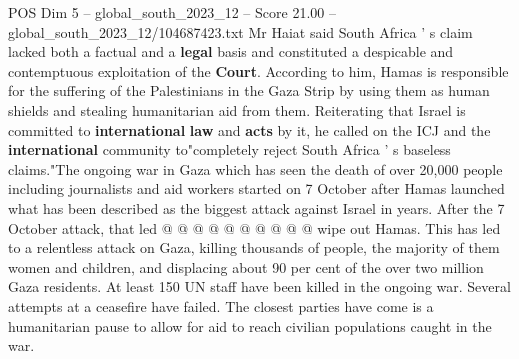\begin{textsample}{POS Dim 5 – global\_south\_2023\_12 – Score 21.00 – global\_south\_2023\_12/104687423.txt}
Mr Haiat said South Africa ' s claim lacked both a factual and a \textbf{legal} basis and constituted a despicable and contemptuous exploitation of the \textbf{Court}.
According to him, Hamas is responsible for the suffering of the Palestinians in the Gaza Strip by using them as human shields and stealing humanitarian aid from them.
Reiterating that Israel is committed to \textbf{international} \textbf{law} and \textbf{acts} by it, he called on the ICJ and the \textbf{international} community to"completely reject South Africa ' s baseless claims."The ongoing war in Gaza which has seen the death of over 20,000 people including journalists and aid workers started on 7 October after Hamas launched what has been described as the biggest attack against Israel in years.
After the 7 October attack, that led @ @ @ @ @ @ @ @ @ @ wipe out Hamas.
This has led to a relentless attack on Gaza, killing thousands of people, the majority of them women and children, and displacing about 90 per cent of the over two million Gaza residents.
At least 150 UN staff have been killed in the ongoing war.
Several attempts at a ceasefire have failed.
The closest parties have come is a humanitarian pause to allow for aid to reach civilian populations caught in the war.

\end{textsample}
